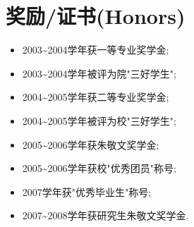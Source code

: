 \documentclass[letterpaper,10pt,english]{manual}
\begin{document}
\section{奖励/证书(Honors)}
\begin{itemize}
\item {} 
2003\textasciitilde{}2004学年获一等专业奖学金;

\item {} 
2003\textasciitilde{}2004学年被评为院"三好学生";

\item {} 
2004\textasciitilde{}2005学年获二等专业奖学金;

\item {} 
2004\textasciitilde{}2005学年被评为校"三好学生";

\item {} 
2005\textasciitilde{}2006学年获朱敬文奖学金;

\item {} 
2005\textasciitilde{}2006学年获校"优秀团员"称号;

\item {} 
2007学年获"优秀毕业生"称号;

\item {} 
2007\textasciitilde{}2008学年获研究生朱敬文奖学金.

\end{itemize}
\end{document}
